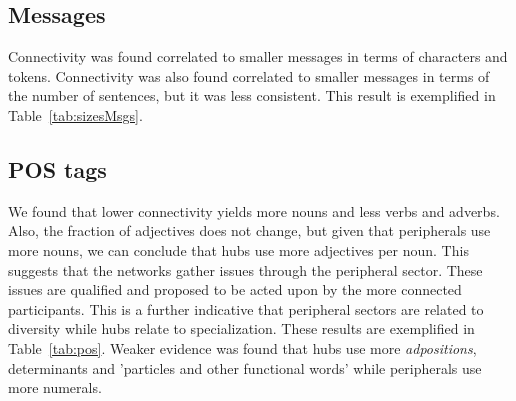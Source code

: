 \subsection{Messages}\label{subsec:mm}
Connectivity was found correlated to smaller messages in terms of characters and tokens.
Connectivity was also found correlated to smaller messages in terms of the number of sentences, but
it was less consistent.
This result is exemplified in Table~\ref{tab:sizesMsgs}.

\FloatBarrier



\subsection{POS tags}\label{subsec:pos}
We found that lower connectivity yields more nouns and less verbs and adverbs.
Also, the fraction of adjectives does not change,
but given that peripherals use more nouns,
we can conclude that hubs use more adjectives per noun.
This suggests that the networks gather issues
through the peripheral sector. 
These issues are qualified and proposed to be acted upon
by the more connected participants.
This is a further indicative that peripheral sectors
are related to diversity while hubs relate to specialization.
These results are exemplified in Table~\ref{tab:pos}.
Weaker evidence was found that hubs use more \emph{adpositions},
determinants and 'particles and other functional words' while
peripherals use more numerals.

\FloatBarrier


